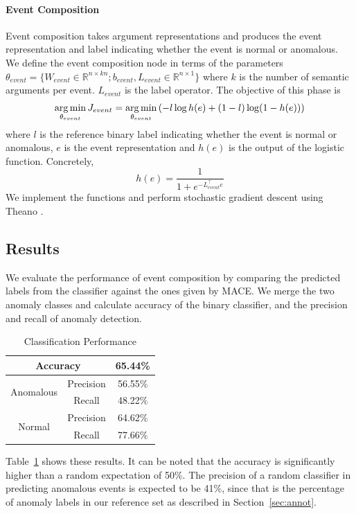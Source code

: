 \paragraph{Event Composition}
Event composition takes argument representations and produces the event
representation and label indicating whether the event is
normal or anomalous.  We define the event composition node in terms of the
parameters $\theta_{event} = \{W_{event} \in \mathbb{R}^{n \times kn}; b_{event},
L_{event} \in \mathbb{R}^{n \times 1}\}$
where $k$ is the number of semantic arguments per event.  $L_{event}$ is the
label operator.  The objective of this
phase is 
\begin{align*}
\begin{aligned}
\operatorname*{arg\,min}_{\theta_{event}} J_{event} = \operatorname*{arg\,min}_{\theta_{event}} \left( - l \log h(e) + (1-l) \log (1 - h(e)) \right)
\end{aligned}
\end{align*}
where $l$ is the reference binary label indicating whether the event is normal or
anomalous, $e$ is the event representation and
$h(e)$ is the output of the logistic function.  Concretely,
\begin{equation*}
 h(e) = \frac{1}{1+e^{-L_{event}^\intercal e}}
\end{equation*}
We implement the functions and perform stochastic gradient descent using Theano
\cite{bergstra2010theano}.

\subsection{Results}
We evaluate the performance of event composition by comparing the predicted
labels from the classifier against the ones given by MACE.
We merge the two anomaly classes and calculate accuracy of the binary
classifier, and the precision and recall of anomaly detection.
\begin{table}
\begin{center}
  \begin{tabular}[c]{|c|c|c|}
 \hline
 \multicolumn{2}{|c|}{Accuracy} & 65.44\% \\
 \hline
 \multirow{2}{*}{Anomalous} & Precision & 56.55\% \\
 \cline{2-3}
 & Recall & 48.22\% \\
 \hline
 \multirow{2}{*}{Normal} & Precision & 64.62\% \\
 \cline{2-3}
 & Recall & 77.66\% \\
 \hline
  \end{tabular}
\end{center}
 \caption{Classification Performance}
 \label{table:res1}
\end{table}
Table~\ref{table:res1} shows these results.  It can be noted that the accuracy
is significantly higher than a random 
expectation of 50\%.  The precision of a random classifier in predicting
anomalous events is expected to be 41\%, since 
that is the percentage of anomaly labels in our reference set as described in
Section~\ref{sec:annot}.

